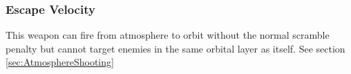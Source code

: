 \subsubsection{Escape Velocity}
This weapon can fire from atmosphere to orbit without the normal scramble penalty but cannot target enemies in the same orbital layer as itself. See section \ref{sec:AtmosphereShooting}